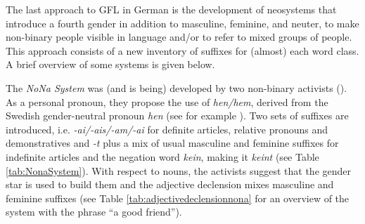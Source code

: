 The last approach to GFL in German is the development of neosystems that introduce a fourth gender in addition to masculine, feminine, and neuter, to make non-binary people visible in language and/or to refer to mixed groups of people. This approach consists of a new inventory of suffixes for (almost) each word class. A brief overview of some systems is given below.

The \textit{NoNa System} was (and is being) developed by two non-binary activists (\cite{NoNa}). As a personal pronoun, they propose the use of \textit{hen/hem}, derived from the Swedish gender-neutral pronoun \textit{hen} (see for example \cite{back2015hen}). Two sets of suffixes are introduced, i.e. \textit{-ai/-ais/-am/-ai} for definite articles, relative pronouns and demonstratives and\textit{ -t }plus a mix of usual masculine and feminine suffixes for indefinite articles and the negation word \textit{kein}, making it \textit{keint} (see Table \ref{tab:NonaSystem}). With respect to nouns, the activists suggest that the gender star is used to build them and the adjective declension mixes masculine and feminine suffixes (see Table \ref{tab:adjectivedeclensionnona} for an overview of the system with the phrase ``a good friend''). 

\begin{table}
    \caption[Pronouns and articles according to the NoNa System]{Pronouns and articles according to the NoNa-System (\cite{NoNa})}
    \label{tab:NonaSystem}
\end{table}

